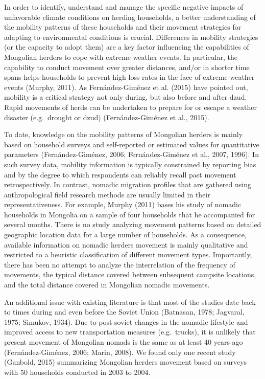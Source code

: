 \documentclass[]{elsarticle} %
\begin{document}
In order to identify, understand and manage the specific negative
impacts of unfavorable climate conditions on herding households, a
better understanding of the mobility patterns of these households and
their movement strategies for adapting to environmental conditions is
crucial. Differences in mobility strategies (or the capacity to adopt
them) are a key factor influencing the capabilities of Mongolian herders
to cope with extreme weather events. In particular, the capability to
conduct movement over greater distances, and/or in shorter time spans
helps households to prevent high loss rates in the face of extreme
weather events (Murphy, 2011). As Fernández-Giménez et al. (2015) have
pointed out, mobility is a critical strategy not only during, but also
before and after dzud. Rapid movements of herds can be undertaken to
prepare for or escape a weather disaster (e.g.~drought or dzud)
(Fernández-Giménez et al., 2015).

To date, knowledge on the mobility patterns of Mongolian herders is
mainly based on household surveys and self-reported or estimated values
for quantitative parameters (Fernández-Giménez, 2006; Fernández-Giménez
et al., 2007, 1996). In such survey data, mobility information is
typically constrained by reporting bias and by the degree to which
respondents can reliably recall past movement retrospectively. In
contrast, nomadic migration profiles that are gathered using
anthropological field research methods are usually limited in their
representativeness. For example, Murphy (2011) bases his study of
nomadic households in Mongolia on a sample of four households that he
accompanied for several months. There is no study analyzing movement
patterns based on detailed geographic location data for a large number
of households. As a consequence, available information on nomadic
herders movement is mainly qualitative and restricted to a heuristic
classification of different movement types. Importantly, there has been
no attempt to analyze the interrelation of the frequency of movements,
the typical distance covered between subsequent campsite locations, and
the total distance covered in Mongolian nomadic movements.

An additional issue with existing literature is that most of the studies
date back to times during and even before the Soviet Union (Batnasan,
1978; Jagvaral, 1975; Simukov, 1934). Due to post-soviet changes in the
nomadic lifestyle and improved access to new transportation measures
(e.g.~trucks), it is unlikely that present movement of Mongolian nomads
is the same as at least 40 years ago (Fernández-Giménez, 2006; Marin,
2008). We found only one recent study (Ganbold, 2015) summarizing
Mongolian herders movement based on surveys with 50 households conducted
in 2003 to 2004.
\end{document}
